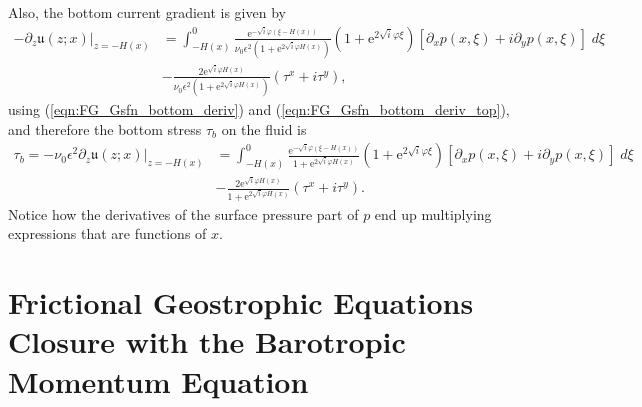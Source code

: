 \documentclass[10pt]{amsart}
\begin{document}
Also, the bottom current gradient is given by
\begin{align}
-\partial_z \left. \mathfrak{u} (z;x) \right|_{z = -H(x)} & =  \int_{-H(x)}^{0} 
 \frac{ \mathrm{e}^{-\sqrt{i} \varphi (\xi - H(x))  } }{ \nu_0 \epsilon^2 \left(1 + \mathrm{e}^{2 \sqrt{i} \varphi H \left(x \right)} \right)}
\left( 1 + \mathrm{e}^{2 \sqrt{i} \varphi \xi}\right) 
 \left[ \partial_x p( x, \xi) + i \partial_y p( x, \xi) \right] \; d \xi \nonumber \\
& - \frac{ 2 \mathrm{e}^{\sqrt{i} \varphi H(x)  } }{ \nu_0 \epsilon^2 \left(1 + \mathrm{e}^{2 \sqrt{i} \varphi H \left(x \right)} \right)}
\left( \tau^x + i \tau^y \right) ,
\end{align}
using (\ref{eqn:FG_Gsfn_bottom_deriv}) and (\ref{eqn:FG_Gsfn_bottom_deriv_top}), and therefore the bottom stress $\tau_b$ on the fluid is
\begin{align}
\tau_b = - \nu_0 \epsilon^2 \partial_z \left. \mathfrak{u} (z;x) \right|_{z = -H(x)} & = \int_{-H(x)}^{0} 
\frac{ \mathrm{e}^{-\sqrt{i} \varphi (\xi - H(x))  } }{ 1 + \mathrm{e}^{2 \sqrt{i} \varphi H \left(x \right)} }
\left( 1 + \mathrm{e}^{2 \sqrt{i} \varphi \xi}\right) 
 \left[ \partial_x p( x, \xi) + i \partial_y p( x, \xi) \right] \; d \xi \nonumber \\
&-\frac{ 2 \mathrm{e}^{\sqrt{i} \varphi H(x)  } }{ 1 + \mathrm{e}^{2 \sqrt{i} \varphi H \left(x \right)} }
 \left( \tau^x + i \tau^y \right) .
 \label{eqn:bottom_stress_expression}
 \end{align}
Notice how the derivatives of the surface pressure part of $p$ end up multiplying expressions that are functions of $x$.

\section{Frictional Geostrophic Equations Closure with the Barotropic Momentum Equation}
\label{sect:FGE_closure}
\end{document}
